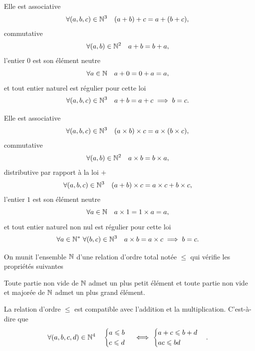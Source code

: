 \begin{prop}[Loi \(+\)]
  Elle est associative 
  \begin{equation}
    \forall (a,b,c) \in \mathbb{N}^3 \quad (a+b)+c=a+(b+c),
  \end{equation}
  commutative
  \begin{equation}
    \forall (a,b) \in \mathbb{N}^2 \quad a+b=b+a,
  \end{equation}
  l'entier \(0\) est son élément neutre
  \begin{equation}
    \forall a \in \mathbb{N} \quad a+0=0+a=a,
  \end{equation}
  et tout entier naturel est régulier pour cette loi
  \begin{equation}
    \forall (a,b,c) \in \mathbb{N}^3 \quad a+b=a+c \implies b=c.
  \end{equation}
\end{prop}
\begin{prop}
  Elle est associative 
  \begin{equation}
    \forall (a,b,c) \in \mathbb{N}^3 \quad (a\times b)\times c=a\times (b\times c),
  \end{equation}
  commutative
  \begin{equation}
    \forall (a,b) \in \mathbb{N}^2 \quad a\times b=b\times a,
  \end{equation}
  distributive par rapport à la loi \(+\)
  \begin{equation}
    \forall (a,b,c) \in \mathbb{N}^3 \quad (a+ b)\times c=a\times c + b\times c,
  \end{equation}
  l'entier \(1\) est son élément neutre
  \begin{equation}
    \forall a \in \mathbb{N} \quad a\times 1=1\times a=a,
  \end{equation}
  et tout entier naturel non nul est régulier pour cette loi
  \begin{equation}
    \forall a \in \mathbb{N}^* \ \forall (b,c) \in \mathbb{N}^3 \quad a\times b=a\times c \implies b=c.
  \end{equation}
\end{prop}
On munit l'ensemble \(\mathbb{N}\) d'une relation d'ordre total notée \(\leqslant\) qui vérifie les propriétés suivantes
\begin{prop}
  Toute partie non vide de \(\mathbb{N}\) admet un plus petit élément et toute partie non vide et majorée de \(\mathbb{N}\) admet un plus grand élément.
\end{prop}
\begin{prop}
  La relation d'ordre \(\leqslant\) est compatible avec l'addition et la multiplication. C'est-à-dire que
  \begin{equation}
    \forall (a,b,c,d)\in \mathbb{N}^4 \quad
    \begin{cases}
      a\leqslant b \\ c \leqslant d
    \end{cases}
    \iff
    \begin{cases}
      a+c\leqslant b+d \\ ac\leqslant bd
    \end{cases}.
  \end{equation}
\end{prop}

